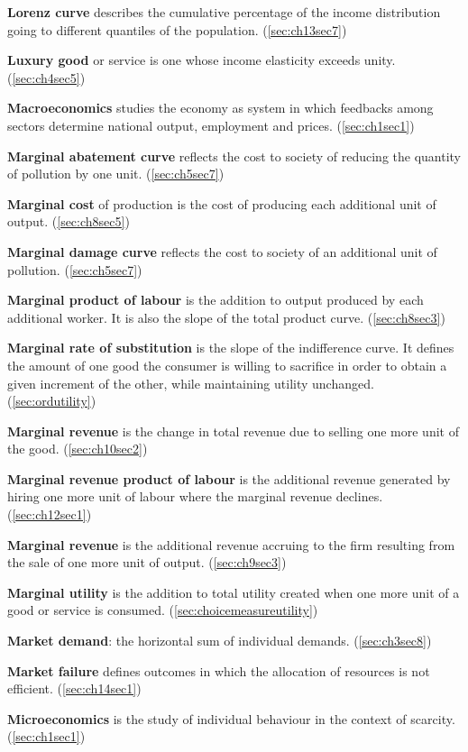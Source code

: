 \textbf{Lorenz curve} describes the cumulative percentage of the income distribution going to different quantiles of the population. (\ref{sec:ch13sec7})

\textbf{Luxury good} or service is one whose income elasticity exceeds unity. (\ref{sec:ch4sec5})

\textbf{Macroeconomics} studies the economy as system in which feedbacks among sectors determine national output, employment and prices. (\ref{sec:ch1sec1})

\textbf{Marginal abatement curve} reflects the cost to society of reducing the quantity of pollution by one unit. (\ref{sec:ch5sec7})

\textbf{Marginal cost} of production is the cost of producing each additional unit of output. (\ref{sec:ch8sec5})

\textbf{Marginal damage curve} reflects the cost to society of an additional unit of pollution. (\ref{sec:ch5sec7})

\textbf{Marginal product of labour} is the addition to output produced by each additional worker. It is also the slope of the total product curve. (\ref{sec:ch8sec3})

\textbf{Marginal rate of substitution} is the slope of the indifference curve. It defines the amount of one good the consumer is willing to sacrifice in order to obtain a given increment of the other, while maintaining utility unchanged. (\ref{sec:ordutility})

\textbf{Marginal revenue} is the change in total revenue due to selling one more unit of the good. (\ref{sec:ch10sec2})

\textbf{Marginal revenue product of labour} is the additional revenue generated by hiring one more unit of labour where the marginal revenue declines. (\ref{sec:ch12sec1})

\textbf{Marginal revenue} is the additional revenue accruing to the firm resulting from the sale of one more unit of output. (\ref{sec:ch9sec3})

\textbf{Marginal utility} is the addition to total utility created when one more unit of a good or service is consumed. (\ref{sec:choicemeasureutility})

\textbf{Market demand}: the horizontal sum of individual demands. (\ref{sec:ch3sec8})

\textbf{Market failure} defines outcomes in which the allocation of resources is not efficient. (\ref{sec:ch14sec1})

\textbf{Microeconomics} is the study of individual behaviour in the context of scarcity. (\ref{sec:ch1sec1})

